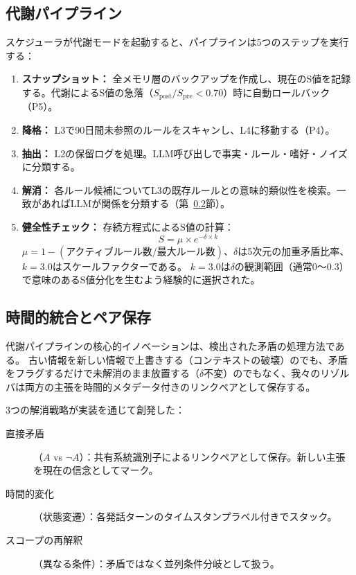 \documentclass[11pt,a4paper]{article}
\begin{document}
\subsection{代謝パイプライン}

スケジューラが代謝モードを起動すると、パイプラインは5つのステップを実行する：

\begin{enumerate}
\item \textbf{スナップショット：} 全メモリ層のバックアップを作成し、現在のS値を記録する。代謝によるS値の急落（$S_{\text{post}} / S_{\text{pre}} < 0.70$）時に自動ロールバック（P5）。

\item \textbf{降格：} L3で90日間未参照のルールをスキャンし、L4に移動する（P4）。

\item \textbf{抽出：} L2の保留ログを処理。LLM呼び出しで事実・ルール・嗜好・ノイズに分類する。

\item \textbf{解消：} 各ルール候補についてL3の既存ルールとの意味的類似性を検索。一致があればLLMが関係を分類する（第~\ref{sec:resolution}節）。

\item \textbf{健全性チェック：} 存続方程式によるS値の計算：
\begin{equation}
S = \mu \times e^{-\delta \times k}
\label{eq:survival}
\end{equation}
$\mu = 1 - (\text{アクティブルール数} / \text{最大ルール数})$、$\delta$は5次元の加重矛盾比率、$k = 3.0$はスケールファクターである。
$k = 3.0$は$\delta$の観測範囲（通常0〜0.3）で意味のあるS値分化を生むよう経験的に選択された。
\end{enumerate}

\subsection{時間的統合とペア保存}
\label{sec:resolution}

代謝パイプラインの核心的イノベーションは、検出された矛盾の処理方法である。
古い情報を新しい情報で上書きする（コンテキストの破壊）のでも、矛盾をフラグするだけで未解消のまま放置する（$\delta$不変）のでもなく、我々のリゾルバは両方の主張を時間的メタデータ付きのリンクペアとして保存する。

3つの解消戦略が実装を通じて創発した：\label{sec:three-strategies}

\begin{description}
\item[直接矛盾]（$A$ vs $\neg A$）：共有系統識別子によるリンクペアとして保存。新しい主張を現在の信念としてマーク。
\item[時間的変化]（状態変遷）：各発話ターンのタイムスタンプラベル付きでスタック。
\item[スコープの再解釈]（異なる条件）：矛盾ではなく並列条件分岐として扱う。
\end{description}
\end{document}
